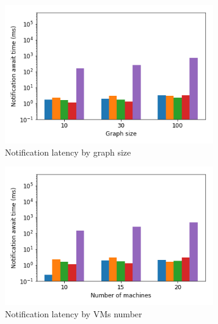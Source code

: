 \begin{figure}[t!]
    \begin{subfigure}[b]{0.32\textwidth}
            \includegraphics[width=0.99\textwidth]{pics/notification_await_time_by_graph_size_bars.png}
            \caption{Notification latency by graph size}
            \label{notification_graph}
    \end{subfigure}
    \hspace{5mm}
    \begin{subfigure}[b]{0.32\textwidth}
            \includegraphics[width=0.99\textwidth]{pics/notification_await_time_by_number_of_machines_bars.png}
            \caption{Notification latency by VMs number}
            \label{notification_machines}
    \end{subfigure}
    \hspace{5mm}
    \begin{subfigure}[b]{0.32\textwidth}

\end{subfigure}
\end{figure}
